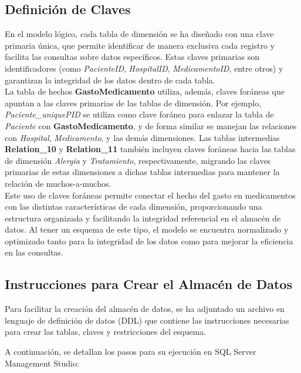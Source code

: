 \documentclass{article}
\begin{document}
\subsection{Definición de Claves}
En el modelo lógico, cada tabla de dimensión se ha diseñado con una clave primaria única, que permite identificar de manera exclusiva cada registro y facilita las consultas sobre datos específicos. Estas claves primarias son identificadores (como \textit{PacienteID}, \textit{HospitalID}, \textit{MedicamentoID}, entre otros) y garantizan la integridad de los datos dentro de cada tabla.
\\

La tabla de hechos \textbf{GastoMedicamento} utiliza, además, claves foráneas que apuntan a las claves primarias de las tablas de dimensión. Por ejemplo, \textit{Paciente\_uniquePID} se utiliza como clave foránea para enlazar la tabla de \textit{Paciente} con \textbf{GastoMedicamento}, y de forma similar se manejan las relaciones con \textit{Hospital}, \textit{Medicamento}, y las demás dimensiones. Las tablas intermedias \textbf{Relation\_10} y \textbf{Relation\_11} también incluyen claves foráneas hacia las tablas de dimensión \textit{Alergia} y \textit{Tratamiento}, respectivamente, migrando las claves primarias de estas dimensiones a dichas tablas intermedias para mantener la relación de muchos-a-muchos.
\\

Este uso de claves foráneas permite conectar el hecho del gasto en medicamentos con las distintas características de cada dimensión, proporcionando una estructura organizada y facilitando la integridad referencial en el almacén de datos. Al tener un esquema de este tipo, el modelo se encuentra normalizado y optimizado tanto para la integridad de los datos como para mejorar la eficiencia en las consultas.
\subsection{Instrucciones para Crear el Almacén de Datos}

Para facilitar la creación del almacén de datos, se ha adjuntado un archivo en lenguaje de definición de datos (DDL) que contiene las instrucciones necesarias para crear las tablas, claves y restricciones del esquema.

A continuación, se detallan los pasos para su ejecución en SQL Server Management Studio:
\end{document}
